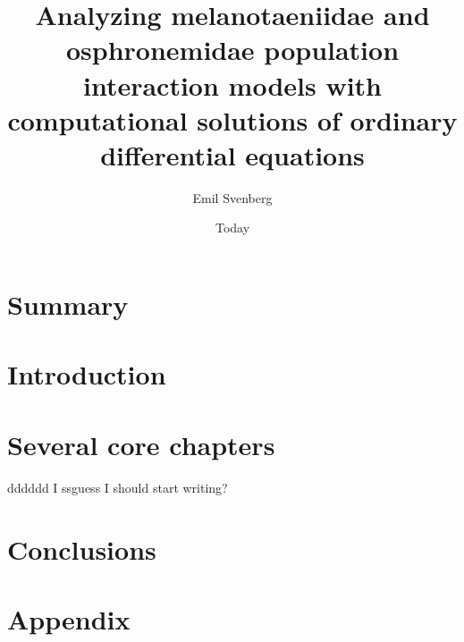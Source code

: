 \documentclass{article}
\title{Analyzing melanotaeniidae and osphronemidae population interaction models with computational solutions of ordinary differential equations}
\author{Emil Svenberg}
\date{Today}
\begin{document}
\maketitle

\section{Summary}
\section{Introduction}


\section{Several core chapters}
dddddd
I ssguess I should start writing?


\section{Conclusions}
\section{Appendix}
\end{document}
